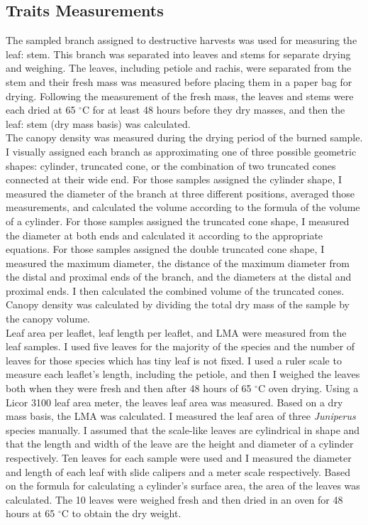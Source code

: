 \documentclass[12pt]{report}
\begin{document}
\subsection{Traits Measurements}
The sampled branch assigned to destructive harvests was used for measuring the leaf: stem. This branch was separated into leaves and stems for separate drying and weighing. The leaves, including petiole and rachis, were separated from the stem and their fresh mass was measured before placing them in a paper bag for drying. Following the measurement of the fresh mass, the leaves and stems were each dried at 65 $^{\circ}$C for at least 48 hours before they dry masses, and then the leaf: stem (dry mass basis) was calculated.\\


The canopy density was measured during the drying period of the burned sample. I visually assigned each branch as approximating one of three possible geometric shapes: cylinder, truncated cone, or the combination of two truncated cones connected at their wide end. For those samples assigned the cylinder shape, I measured the diameter of the branch at three different positions, averaged those measurements, and calculated the volume according to the formula of the volume of a cylinder. For those samples assigned the truncated cone shape, I measured the diameter at both ends and calculated it according to the appropriate equations. For those samples assigned the double truncated cone shape, I measured the maximum diameter, the distance of the maximum diameter from the distal and proximal ends of the branch, and the diameters at the distal and proximal ends. I then calculated the combined volume of the truncated cones. Canopy density was calculated by dividing the total dry mass of the sample by the canopy volume.\\

Leaf area per leaflet, leaf length per leaflet, and LMA were measured from the leaf samples. I used five leaves for the majority of the species and the number of leaves for those species which has tiny leaf is not fixed. I used a ruler scale to measure each leaflet's length, including the petiole, and then I weighed the leaves both when they were fresh and then after 48 hours of 65 $^{\circ}$C oven drying. Using a Licor 3100 leaf area meter, the leaves leaf area was measured. Based on a dry mass basis, the LMA was calculated. I measured the leaf area of three \emph{Juniperus} species manually. I assumed that the scale-like leaves are cylindrical in shape and that the length and width of the leave are the height and diameter of a cylinder respectively. Ten leaves for each sample were used and I measured the diameter and length of each leaf with slide calipers and a meter scale respectively. Based on the formula for calculating a cylinder's surface area, the area of the leaves was calculated. The 10 leaves were weighed fresh and then dried in an oven for 48 hours at 65 $^{\circ}$C to obtain the dry weight.
\end{document}

